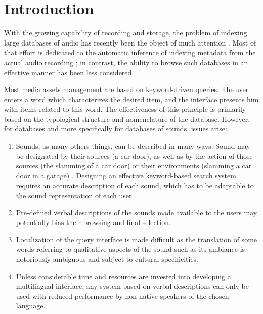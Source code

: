 \documentclass{aes2e}
\begin{document}



\section{Introduction}

With the growing capability of recording and storage, the problem of indexing large databases of audio has recently been the object of much attention \cite{Wold1996}. Most of that effort is dedicated to the automatic inference of indexing metadata from the actual audio recording \cite{Zhang1999, tzanetakis2002musical}; in contrast, the ability to browse such databases in an effective manner has been less considered.


Most media assets management are based on keyword-driven queries. The user enters a word which characterizes the desired item, and the interface presents him with items related to this word. The effectiveness of this principle is primarily based on the typological structure and nomenclature of the database. However, for databases and more specifically for databases of sounds, issues arise:

\begin{enumerate}
\item Sounds, as many others things, can be described in many ways. Sound may be designated by their
sources (a car door), as well as by the action of those sources (the slamming of a car door) or their environments (slamming a car door in a garage) \cite{houix2012lexical, niessen2010categories, brown2011towards}. Designing an effective keyword-based search system requires an accurate description of each sound, which has to be adaptable to the sound representation of each user.
\item Pre-defined verbal descriptions of the sounds made available to the users may potentially bias their browsing and final selection.
\item Localization of the query interface is made difficult as the translation of some words referring to qualitative aspects of the sound such as its ambiance is notoriously ambiguous and subject to cultural specificities.
\item Unless considerable time and resources are invested into developing a multilingual interface, any system based on verbal descriptions can only be used with reduced performance by non-native speakers of the chosen language.
\end{enumerate}
\end{document}
